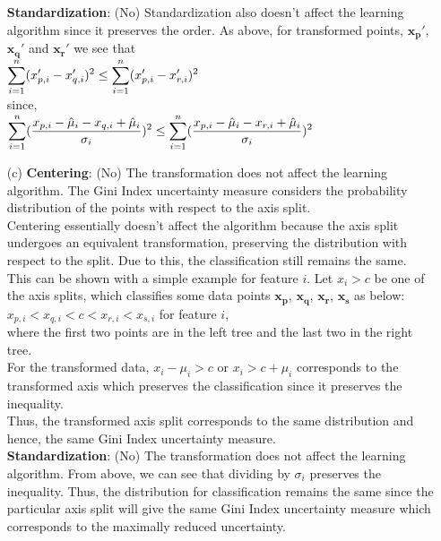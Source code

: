 \documentclass[fleqn]{article}
\begin{document}
\begin{itemize}
		\textbf{Standardization}: (No) Standardization also doesn't affect the learning algorithm since it preserves the order.
		As above, for transformed points, $\bm{x_p'}$, $\bm{x_q'}$ and $\bm{x_r'}$ we see that \\
		$ \smashoperator{\sum_{i = 1}^{n}} (x_{p,i}' - x_{q, i}')^2 \leq \smashoperator{\sum_{i = 1}^{n}} (x_{p,i}' - x_{r, i}')^2 $\\
		since, \\
		$ \smashoperator{\sum_{i = 1}^{n}} (\frac{x_{p,i} - \hat{\mu}_i - x_{q, i} + \hat{\mu}_i}{\sigma_i})^2 
			\leq \smashoperator{\sum_{i = 1}^{n}} (\frac{x_{p,i} - \hat{\mu}_i - x_{r, i} + \hat{\mu}_i}{\sigma_i})^2$ \\

        \item[(c)]
		\textbf{Centering}: (No) The transformation does not affect the learning algorithm.
		The Gini Index uncertainty measure considers the probability distribution of the points with respect to the axis split.\\
		Centering essentially doesn't affect the algorithm because the axis split undergoes an equivalent transformation, 
		preserving the distribution with respect to the split. Due to this, the classification still remains the same.\\
		This can be shown with a simple example for feature $i$. Let $x_i > c$ be one of the axis splits, 
		which classifies some data points $\bm{x_p}$, $\bm{x_q}$, $\bm{x_r}$, $\bm{x_s}$ as below:\\
		$x_{p, i} < x_{q, i} < c < x_{r, i} < x_{s, i}$ for feature $i$,\\
		where the first two points are in the left tree and the last two in the right tree.\\
		For the transformed data, $x_i - \mu_i > c$ or $x_i > c + \mu_i$ corresponds to the transformed axis 
		which preserves the classification since it preserves the inequality.\\
		Thus, the transformed axis split corresponds to the same distribution and hence, the same Gini Index uncertainty measure.\\

		\textbf{Standardization}: (No) The transformation does not affect the learning algorithm. 
		From above, we can see that dividing by $\sigma_i$ preserves the inequality.
		Thus, the distribution for classification remains the same since the particular axis split 
		will give the same Gini Index uncertainty measure which corresponds to the maximally reduced uncertainty.\\


\end{itemize}
\end{document}
